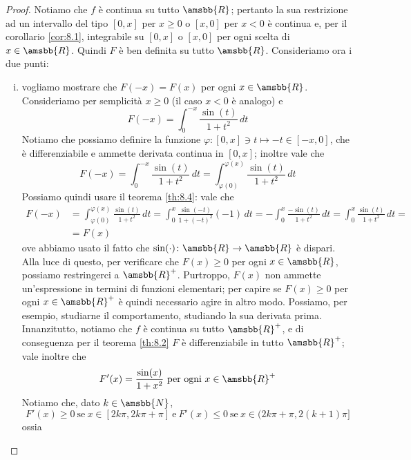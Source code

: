 \begin{proof}
    Notiamo che $f$ è continua su tutto $\amsbb{R}$; pertanto la sua restrizione ad un intervallo del tipo $[0,x]$ per $x\ge 0$ o $[x,0]$ per $x<0$ è continua e, per il corollario \ref{cor:8.1}, integrabile su $[0,x]$ o $[x,0]$ per ogni scelta di $x\in\amsbb{R}$. Quindi $F$ è ben definita su tutto $\amsbb{R}$. Consideriamo ora i due punti:
    \begin{enumerate}[(i)]
        \item vogliamo mostrare che $F(-x) = F(x)$ per ogni $x\in\amsbb{R}$. Consideriamo per semplicità $x\ge 0$ (il caso $x<0$ è analogo) e
        \[
        F(-x) = \int_0^{-x} \frac{\sin(t)}{1+t^2}\, dt
        \]
        Notiamo che possiamo definire la funzione $\varphi\colon [0,x]\ni t\mapsto  -t\in [-x,0]$, che è differenziabile e ammette derivata continua in $[0,x]$; inoltre vale che
        \[
        F(-x) = \int_0^{-x}\frac{\sin(t)}{1+t^2}\, dt = \int_{\varphi(0)}^{\varphi(x)}\frac{\sin(t)}{1+t^2}\, dt
        \]
        Possiamo quindi usare il teorema \ref{th:8.4}: vale che
        \[
        \begin{split}
            F(-x) & = \int_{\varphi(0)}^{\varphi(x)}\frac{\sin(t)}{1+t^2}\, dt = \int_0^x \frac{\sin(-t)}{1+(-t)^2}(-1)\, dt = -\int_0^x \frac{-\sin(t)}{1+t^2}\, dt = \int_0^x \frac{\sin(t)}{1+t^2}\, dt = \\
            & = F(x)
        \end{split}
        \]
        ove abbiamo usato il fatto che $\sin(\cdot)\colon\amsbb{R}\to\amsbb{R}$ è dispari.\\
        Alla luce di questo, per verificare che $F(x)\ge 0$ per ogni $x\in\amsbb{R}$, possiamo restringerci a $\amsbb{R}^+$. Purtroppo, $F(x)$ non ammette un'espressione in termini di funzioni elementari; per capire se $F(x)\ge 0$ per ogni $x\in\amsbb{R}^+$ è quindi necessario agire in altro modo. Possiamo, per esempio, studiarne il comportamento, studiando la sua derivata prima. Innanzitutto, notiamo che $f$ è continua su tutto $\amsbb{R}^+$, e di conseguenza per il teorema \ref{th:8.2} $F$ è differenziabile in tutto $\amsbb{R}^+$; vale inoltre che
        \[
        F'(x) = \frac{\sin(x)}{1+x^2} \ \text{per ogni} \ x\in\amsbb{R}^+
        \]
        Notiamo che, dato $k\in\amsbb{N}$,
        \[
        F'(x)\ge 0 \ \text{se} \ x\in[2k\pi, 2k\pi + \pi] \ \text{e} \ F'(x)\le 0 \ \text{se} \ x\in(2k\pi+\pi, 2(k+1)\pi]
        \]
        ossia
        \begin{center}
            \begin{tikzpicture}

\end{tikzpicture}
\end{center}
\end{enumerate}
\end{proof}
